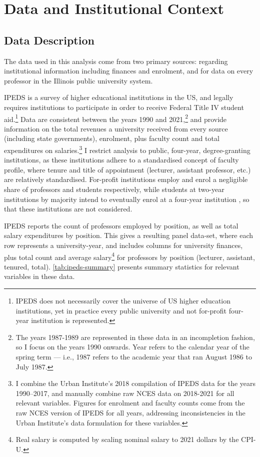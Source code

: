 \section{Data and Institutional Context}
\label{sec:data}

\subsection{Data Description}
The data used in this analysis come from two primary sources: \citet[IPEDS]{ipeds} regarding institutional information including finances and enrolment, and \citet[IBHED]{ibhed} for data on every professor in the Illinois public university system.

IPEDS is a survey of higher educational institutions in the US, and legally requires institutions to participate in order to receive Federal Title IV student aid.\footnote{
    IPEDS does not necessarily cover the universe of US higher education institutions, yet in practice every public university and not for-profit four-year institution is represented.
}
Data are consistent between the years 1990 and 2021,\footnote{
    The years 1987-1989 are represented in these data in an incompletion fashion, so I focus on the years 1990 onwards.
    Year refers to the calendar year of the spring term --- i.e., 1987 refers to the academic year that ran August 1986 to July 1987.
}
and provide information on the total revenues a university received from every source (including state governments), enrolment, plus faculty count and total expenditures on salaries.\footnote{
    I combine the Urban Institute's 2018 compilation of IPEDS data for the years 1990--2017, and manually combine raw NCES data on 2018-2021 for all relevant variables.
    Figures for enrolment and faculty counts come from the raw NCES version of IPEDS for all years, addressing inconsistencies in the Urban Institute's data formulation for these variables.
}
I restrict analysis to public, four-year, degree-granting institutions, as these institutions adhere to a standardised concept of faculty profile, where tenure and title of appointment (lecturer, assistant professor, etc.) are relatively standardised.
For-profit institutions employ and enrol a negligible share of professors and students respectively, while students at two-year institutions by majority intend to eventually enrol at a four-year institution \citep{mountjoy2022}, so that these institutions are not considered.

IPEDS reports the count of professors employed by position, as well as total salary expenditures by position.
This gives a resulting panel data-set, where each row represents a university-year, and includes columns for university finances, plus total count and average salary\footnote{
    Real salary is computed by scaling nominal salary to 2021 dollars by the CPI-U.
} for professors by position (lecturer, assistant, tenured, total).
\autoref{tab:ipeds-summary} presents summary statistics for relevant variables in these data.

